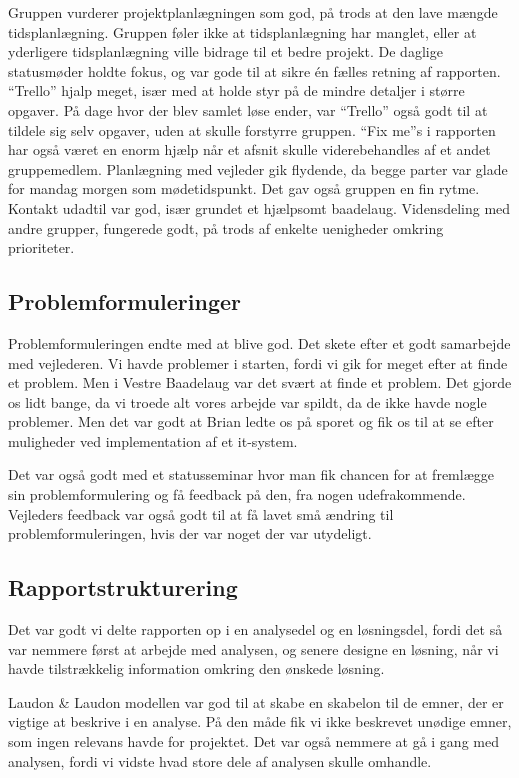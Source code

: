 \documentclass[a4paper,12pt,oneside]{article}
\begin{document}
Gruppen vurderer projektplanlægningen som god, på trods at den lave mængde tidsplanlægning. Gruppen føler ikke at tidsplanlægning har manglet, eller at yderligere tidsplanlægning ville bidrage til et bedre projekt. De daglige statusmøder holdte fokus, og var gode til at sikre én fælles retning af rapporten. \enquote{Trello} hjalp meget, især med at holde styr på de mindre detaljer i større opgaver. På dage hvor der blev samlet løse ender, var \enquote{Trello} også godt til at tildele sig selv opgaver, uden at skulle forstyrre gruppen. \enquote{Fix me}s i rapporten har også været en enorm hjælp når et afsnit skulle viderebehandles af et andet gruppemedlem. Planlægning med vejleder gik flydende, da begge parter var glade for mandag morgen som mødetidspunkt. Det gav også gruppen en fin rytme. Kontakt udadtil var god, især grundet et hjælpsomt baadelaug. Vidensdeling med andre grupper, fungerede godt, på trods af enkelte uenigheder omkring prioriteter.

\subsection{Problemformuleringer}
Problemformuleringen endte med at blive god. Det skete efter et godt samarbejde med vejlederen. Vi havde problemer i starten, fordi vi gik for meget efter at finde et problem. Men i Vestre Baadelaug var det svært at finde et problem. Det gjorde os lidt bange, da vi troede alt vores arbejde var spildt, da de ikke havde nogle problemer. Men det var godt at Brian ledte os på sporet og fik os til at se efter muligheder ved implementation af et it-system.

Det var også godt med et statusseminar hvor man fik chancen for at fremlægge sin problemformulering og få feedback på den, fra nogen udefrakommende. Vejleders feedback var også godt til at få lavet små ændring til problemformuleringen, hvis der var noget der var utydeligt.

\subsection{Rapportstrukturering}

Det var godt vi delte rapporten op i en analysedel og en løsningsdel, fordi det så var nemmere først at arbejde med analysen, og senere designe en løsning, når vi havde tilstrækkelig information omkring den ønskede løsning.

Laudon \& Laudon modellen var god til at skabe en skabelon til de emner, der er vigtige at beskrive i en analyse. På den måde fik vi ikke beskrevet unødige emner, som ingen relevans havde for projektet. Det var også nemmere at gå i gang med analysen, fordi vi vidste hvad store dele af analysen skulle omhandle.
\end{document}
